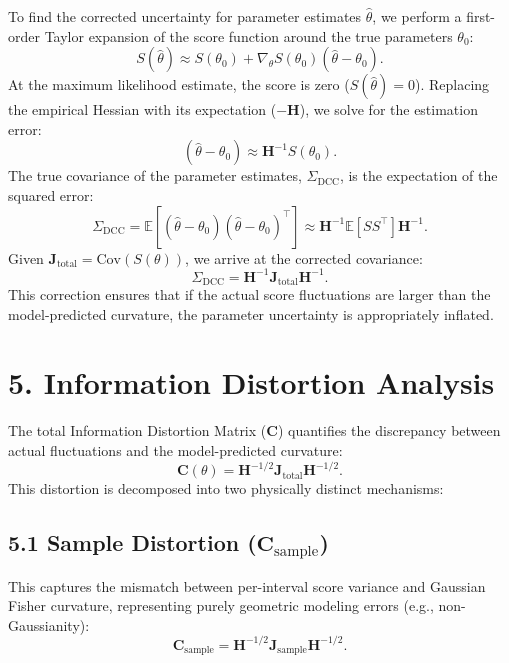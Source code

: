 \documentclass[11pt]{article}
\begin{document}
To find the corrected uncertainty for parameter estimates $\hat{\theta}$, we perform a first-order Taylor expansion of the score function around the true parameters $\theta_0$:
\begin{equation}
S(\hat{\theta}) \approx S(\theta_0) + \nabla_\theta S(\theta_0) (\hat{\theta} - \theta_0).
\end{equation}
At the maximum likelihood estimate, the score is zero ($S(\hat{\theta}) = 0$). Replacing the empirical Hessian with its expectation ($-\mathbf{H}$), we solve for the estimation error:
\begin{equation}
(\hat{\theta} - \theta_0) \approx \mathbf{H}^{-1} S(\theta_0).
\end{equation}
The true covariance of the parameter estimates, $\Sigma_{\mathrm{DCC}}$, is the expectation of the squared error:
\begin{equation}
\Sigma_{\mathrm{DCC}} = \mathbb{E}\left[(\hat{\theta} - \theta_0)(\hat{\theta} - \theta_0)^\top\right] \approx \mathbf{H}^{-1} \mathbb{E}[S S^\top] \mathbf{H}^{-1}.
\end{equation}
Given $\mathbf{J}_{\mathrm{total}} = \mathrm{Cov}(S(\theta))$, we arrive at the corrected covariance:
\begin{equation}
\Sigma_{\mathrm{DCC}} = \mathbf{H}^{-1} \mathbf{J}_{\mathrm{total}} \mathbf{H}^{-1}.
\end{equation}
This correction ensures that if the actual score fluctuations are larger than the model-predicted curvature, the parameter uncertainty is appropriately inflated.

\section*{5. Information Distortion Analysis}

The total Information Distortion Matrix ($\mathbf{C}$) quantifies the discrepancy between actual fluctuations and the model-predicted curvature:
\begin{equation}
\mathbf{C}(\theta) = \mathbf{H}^{-1/2} \mathbf{J}_{\mathrm{total}} \mathbf{H}^{-1/2}.
\end{equation}
This distortion is decomposed into two physically distinct mechanisms:

\subsection*{5.1 Sample Distortion ($\mathbf{C}_{\mathrm{sample}}$)}
This captures the mismatch between per-interval score variance and Gaussian Fisher curvature, representing purely geometric modeling errors (e.g., non-Gaussianity):
\begin{equation}
\mathbf{C}_{\mathrm{sample}} = \mathbf{H}^{-1/2} \mathbf{J}_{\mathrm{sample}} \mathbf{H}^{-1/2}.
\end{equation}
\end{document}
